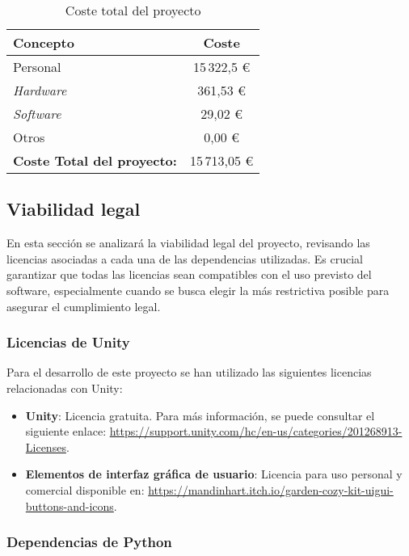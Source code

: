 \begin{table}[H]
        \caption{Coste total del proyecto}
	\label{Costproject}
	\centering
	\begin{tabular}{ l  c }
		\toprule
		\textbf{Concepto} & \textbf{Coste} \\ \midrule
		Personal & 15\,322,5 €\\
		\textit{Hardware} & 361,53  € \\
		\textit{Software} & 29,02 €\\
		Otros & 0,00 €\\
		
		\midrule
		\textbf{Coste Total del proyecto:} & 15\,713,05 € \\
		\bottomrule
	\end{tabular}
\end{table}


\subsection{Viabilidad legal}

En esta sección se analizará la viabilidad legal del proyecto, revisando las licencias asociadas a cada una de las dependencias utilizadas. Es crucial garantizar que todas las licencias sean compatibles con el uso previsto del software, especialmente cuando se busca elegir la más restrictiva posible para asegurar el cumplimiento legal.

\subsubsection{Licencias de Unity}

Para el desarrollo de este proyecto se han utilizado las siguientes licencias relacionadas con Unity:
\begin{itemize}
    \item \textbf{Unity}: Licencia gratuita. Para más información, se puede consultar el siguiente enlace: \url{https://support.unity.com/hc/en-us/categories/201268913-Licenses}.
    \item \textbf{Elementos de interfaz gráfica de usuario}: Licencia para uso personal y comercial disponible en: \url{https://mandinhart.itch.io/garden-cozy-kit-uigui-buttons-and-icons}.
\end{itemize}

\subsubsection{Dependencias de Python}

